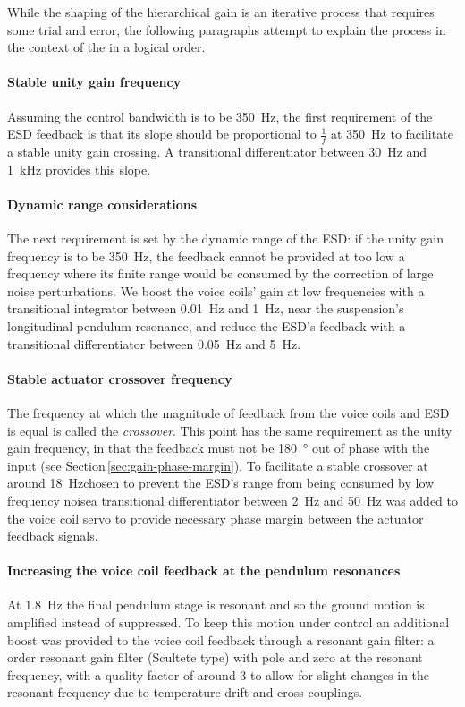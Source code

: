 While the shaping of the hierarchical gain is an iterative process that requires some trial and error, the following paragraphs attempt to explain the process in the context of the \SSMEXPT{} in a logical order.

\paragraph{Stable unity gain frequency}
Assuming the control bandwidth is to be \SI{350}{\hertz}, the first requirement of the \gls{ESD} feedback is that its slope should be proportional to $\frac{1}{f}$ at \SI{350}{\hertz} to facilitate a stable unity gain crossing. A transitional differentiator between \SI{30}{\hertz} and \SI{1}{\kilo\hertz} provides this slope.

\paragraph{Dynamic range considerations}
The next requirement is set by the dynamic range of the \gls{ESD}: if the unity gain frequency is to be \SI{350}{\hertz}, the feedback cannot be provided at too low a frequency where its finite range would be consumed by the correction of large noise perturbations. We boost the voice coils' gain at low frequencies with a transitional integrator between \SI{0.01}{\hertz} and \SI{1}{\hertz}, near the suspension's longitudinal pendulum resonance, and reduce the \gls{ESD}'s feedback with a transitional differentiator between \SI{0.05}{\hertz} and \SI{5}{\hertz}.

\paragraph{Stable actuator crossover frequency}
The frequency at which the magnitude of feedback from the voice coils and \gls{ESD} is equal is called the \emph{crossover}. This point has the same requirement as the unity gain frequency, in that the feedback must not be \SI{180}{\degree} out of phase with the input (see Section\,\ref{sec:gain-phase-margin}). To facilitate a stable crossover at around \SI{18}{\hertz}\textemdash chosen to prevent the \gls{ESD}'s range from being consumed by low frequency noise\textemdash a transitional differentiator between \SI{2}{\hertz} and \SI{50}{\hertz} was added to the voice coil servo to provide necessary phase margin between the actuator feedback signals.

\paragraph{Increasing the voice coil feedback at the pendulum resonances}
At \SI{1.8}{\hertz} the final pendulum stage is resonant and so the ground motion is amplified instead of suppressed. To keep this motion under control an additional boost was provided to the voice coil feedback through a resonant gain filter: a  order resonant gain filter (Scultete type) with pole and zero at the resonant frequency, with a quality factor of around \num{3} to allow for slight changes in the resonant frequency due to temperature drift and cross-couplings.

